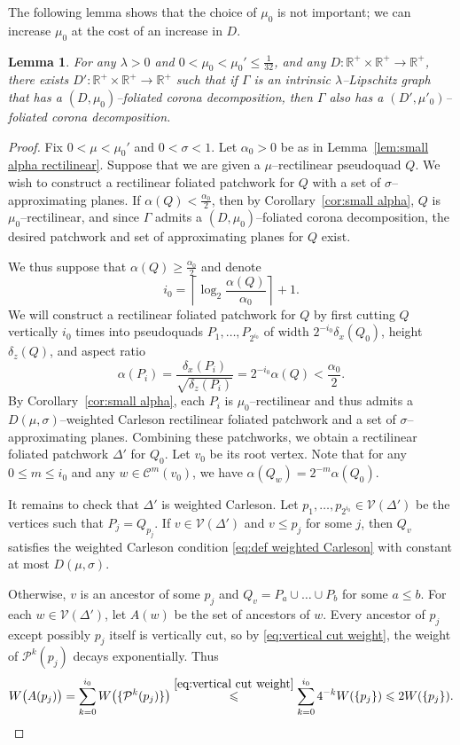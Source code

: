 \documentclass[11pt,reqno]{amsart}
\newcommand{\R}{\mathbb{R}}
\newcommand{\cC}{\mathcal{C}}
\newcommand{\cP}{\mathcal{P}}
\newcommand{\cV}{\mathcal{V}}
\newcommand{\0}{\mathbf{0}}
\renewcommand{\1}{\mathbf 1}
\newcommand{\from}{\colon}
\renewcommand{\ge}{\geqslant}
\renewcommand{\le}{\leqslant}
\newtheorem{lemma}[thm]{Lemma}
\theoremstyle{remark}
\begin{document}
The following lemma shows that the choice of $\mu_0$ is not important; we can increase $\mu_0$ at the cost of an increase in $D$.
\begin{lemma}\label{lem:increas mu0}
 For any $\lambda>0$ and $0<\mu_0<\mu_0'\le \frac{1}{32}$, and any $D\from \R^+\times \R^+\to \R^+$, there exists $D'\from \R^+\times \R^+\to \R^+$ such that if $\Gamma$ is an intrinsic $\lambda$--Lipschitz graph that has a $(D,\mu_0)$--foliated corona decomposition, then $\Gamma$ also has a $(D',\mu'_0)$--foliated corona decomposition.
\end{lemma}
\begin{proof}
  Fix $0<\mu<\mu_0'$ and $0<\sigma<1$.   Let $\alpha_0>0$ be as in Lemma~\ref{lem:small alpha rectilinear}. Suppose that we are given a $\mu$--rectilinear pseudoquad $Q$.  We wish to construct a rectilinear foliated patchwork for $Q$ with a set of $\sigma$--approximating planes.  If $\alpha(Q)<\frac{\alpha_0}{2}$, then by Corollary~\ref{cor:small alpha}, $Q$ is $\mu_0$--rectilinear, and since $\Gamma$ admits a $(D,\mu_0)$--foliated corona decomposition, the desired patchwork and set of approximating planes for $Q$ exist.

  We thus suppose that $\alpha(Q)\ge \frac{\alpha_0}{2}$ and denote
  $$i_0=\left\lceil \log_2\frac{\alpha(Q)}{\alpha_0} \right\rceil+1.$$
  We will construct a rectilinear foliated patchwork for $Q$ by first cutting $Q$ vertically $i_0$ times into pseudoquads $P_1,\dots, P_{2^{i_0}}$ of width $2^{-i_0}\delta_x(Q_0)$,  height $\delta_z(Q)$, and aspect ratio
  $$\alpha(P_i)=\frac{\delta_x(P_i)}{\sqrt{\delta_z(P_i)}}=2^{-i_0}\alpha(Q) < \frac{\alpha_0}{2}.$$
  By Corollary~\ref{cor:small alpha}, each $P_i$ is $\mu_0$--rectilinear and thus admits a $D(\mu,\sigma)$--weighted Carleson rectilinear foliated patchwork and a set of $\sigma$--approximating planes.  Combining these patchworks, we obtain a rectilinear foliated patchwork $\Delta'$ for $Q_0$.  Let $v_0$ be its root vertex.  Note that for any $0\le m\le i_0$ and any $w\in \cC^m(v_0)$, we have $\alpha(Q_w)=2^{-m}\alpha(Q_0)$.

  It remains to check that $\Delta'$ is weighted Carleson.  Let $p_1,\dots, p_{2^{i_0}}\in \cV(\Delta')$ be the vertices such that $P_j=Q_{p_j}$.  If $v\in \cV(\Delta')$ and $v\le p_j$ for some $j$, then $Q_v$ satisfies the weighted Carleson condition \eqref{eq:def weighted Carleson}  with constant at most $D(\mu,\sigma)$.

  Otherwise, $v$ is an ancestor of some $p_j$ and $Q_v=P_a\cup \dots\cup P_b$ for some $a\le b$.  For each $w\in \cV(\Delta')$, let $A(w)$ be the set of ancestors of $w$.  Every ancestor of $p_j$ except possibly $p_j$ itself is vertically cut, so by \eqref{eq:vertical cut weight}, the weight of $\cP^k(p_j)$ decays exponentially.  Thus
  $$W\big(A(p_j)\big)= \sum_{k=0}^{i_0} W\big(\{\cP^k(p_j)\}\big) \stackrel{\eqref{eq:vertical cut weight}}{\le} \sum_{k=0}^{i_0} 4^{-k} W(\{p_j\}) \le 2 W(\{p_j\}).$$


\end{proof}
\end{document}
